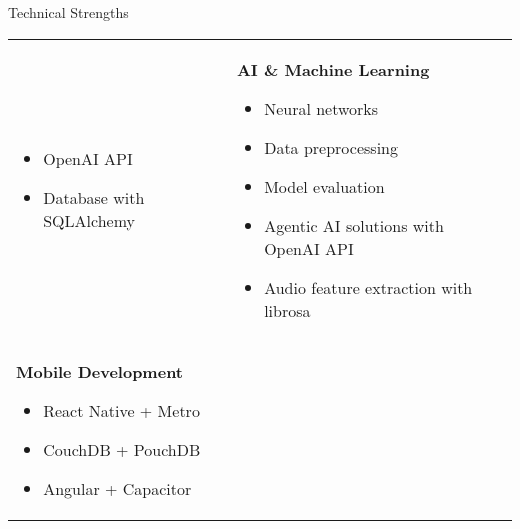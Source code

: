\begin{rSection}{Technical Strengths}
\begin{tabular}{p{} p{}}
\begin{itemize}
            \item OpenAI API
            \item Database with SQLAlchemy
        \end{itemize}
         &
        \vspace{0.5em}
        \textbf{AI \& Machine Learning}
        \begin{itemize}
            \item Neural networks
            \item Data preprocessing
            \item Model evaluation
            \item Agentic AI solutions with OpenAI API
            \item Audio feature extraction with librosa
        \end{itemize}
        \\
        \vspace{0.5em}
        \textbf{Mobile Development}
        \begin{itemize}
            \item React Native + Metro
            \item CouchDB + PouchDB
            \item Angular + Capacitor
        \end{itemize}
    \end{tabular}
\end{rSection}
